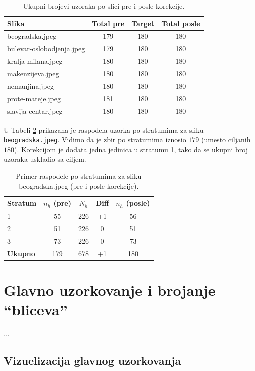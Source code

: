 \documentclass[a4paper,12pt]{article}
\begin{document}
\begin{table}[H]
\centering
\begin{tabular}{lccc}
\hline
Slika & Total pre & Target & Total posle \\
\hline
beogradska.jpeg          & 179 & 180 & 180 \\
bulevar-oslobodjenja.jpeg & 179 & 180 & 180 \\
kralja-milana.jpeg       & 180 & 180 & 180 \\
makenzijeva.jpeg         & 180 & 180 & 180 \\
nemanjina.jpeg           & 180 & 180 & 180 \\
prote-mateje.jpeg        & 181 & 180 & 180 \\
slavija-centar.jpeg      & 180 & 180 & 180 \\
\hline
\end{tabular}
\caption{Ukupni brojevi uzoraka po slici pre i posle korekcije.}
\label{tab:alloc-fix-real}
\end{table}

\noindent
U Tabeli \ref{tab:alloc-beogradska} prikazana je raspodela uzorka po stratumima za sliku \texttt{beogradska.jpeg}.  
Vidimo da je zbir po stratumima iznosio $179$ (umesto ciljanih $180$).  
Korekcijom je dodata jedna jedinica u stratumu 1, tako da se ukupni broj uzoraka uskladio sa ciljem.

\begin{table}[H]
\centering
\begin{tabular}{lcccc}
\hline
Stratum & $n_h$ (pre) & $N_h$ & Diff & $n_h$ (posle) \\
\hline
1 & 55 & 226 & +1 & 56 \\
2 & 51 & 226 & 0  & 51 \\
3 & 73 & 226 & 0  & 73 \\
\hline
\textbf{Ukupno} & 179 & 678 & +1 & 180 \\
\hline
\end{tabular}
\caption{Primer raspodele po stratumima za sliku beogradska.jpeg (pre i posle korekcije).}
\label{tab:alloc-beogradska}
\end{table}

\section{Glavno uzorkovanje i brojanje “bliceva”}

... 

\subsection{Vizuelizacija glavnog uzorkovanja}
\end{document}
